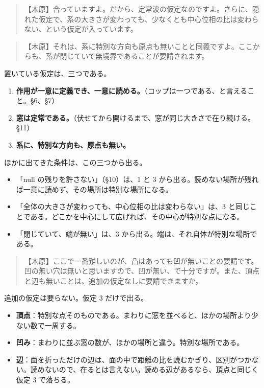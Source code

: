\documentclass[
  a4paper,
]{ltjsarticle}
\providecommand{\tightlist}{%
  \setlength{\itemsep}{0pt}\setlength{\parskip}{0pt}}
\begin{document}
\begin{quote}
【木原】合っていますよ。だから、定常波の仮定なのですよ。さらに、隠れた仮定で、系の大きさが変わっても、少なくとも中心位相の比は変わらない、という仮定が入っています。
\end{quote}

\begin{quote}
【木原】それは、系に特別な方向も原点も無いことと同義ですよ。ここからも、系が閉じていて無境界であることが要請されます。
\end{quote}

置いている仮定は、三つである。

\begin{enumerate}
\def\labelenumi{\arabic{enumi}.}
\tightlist
\item
  \textbf{作用が一意に定義でき、一意に読める。}（コップは一つである、と言えること。§6、§7）
\item
  \textbf{窓は定常である。}（伏せてから開けるまで、窓が同じ大きさで在り続ける。§11）
\item
  \textbf{系に、特別な方向も、原点も無い。}
\end{enumerate}

ほかに出てきた条件は、この三つから出る。

\begin{itemize}
\tightlist
\item
  「null の残りを許さない」（§10）は、1 と 3
  から出る。読めない場所が残れば一意に読めず、その場所は特別な場所になる。
\item
  「全体の大きさが変わっても、中心位相の比は変わらない」は、3
  と同じことである。どこかを中心にして広げれば、その中心が特別な点になる。
\item
  「閉じていて、端が無い」は、3
  から出る。端は、それ自体が特別な場所である。
\end{itemize}

\begin{quote}
【木原】ここで一番難しいのが、凸はあっても凹が無いことの要請です。凹の無い穴は無いと思いますので、凹が無い、で十分ですが。また、頂点と辺も無いことは、追加の仮定なしに要請できますか。
\end{quote}

追加の仮定は要らない。仮定 3 だけで出る。

\begin{itemize}
\tightlist
\item
  \textbf{頂点}：特別な点そのものである。まわりに窓を並べると、ほかの場所より少ない数で一周する。
\item
  \textbf{凹み}：まわりに並ぶ窓の数が、ほかの場所と違う。特別な場所である。
\item
  \textbf{辺}：面を折っただけの辺は、面の中で距離の比を読むかぎり、区別がつかない。読めないので、在るとは言えない。読める辺があるなら、頂点と同じく仮定
  3 で落ちる。
\end{itemize}
\end{document}
